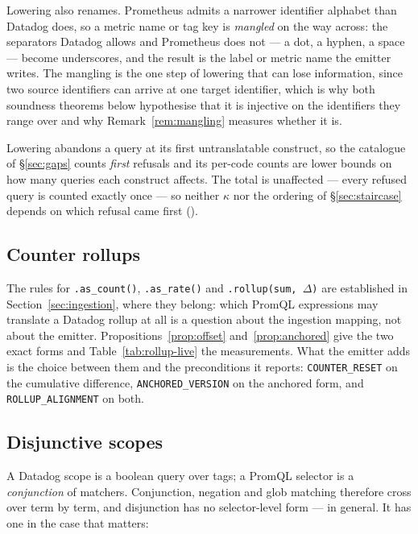 Lowering also renames. Prometheus admits a narrower identifier alphabet than Datadog
does, so a metric name or tag key is \emph{mangled} on the way across: the separators
Datadog allows and Prometheus does not --- a dot, a hyphen, a space --- become
underscores, and the result is the label or metric name the emitter writes. The mangling
is the one step of lowering that can lose information, since two source identifiers can
arrive at one target identifier, which is why both soundness theorems below hypothesise
that it is injective on the identifiers they range over and why
Remark~\ref{rem:mangling} measures whether it is.

Lowering abandons a query at its first untranslatable construct, so the catalogue of
\S\ref{sec:gaps} counts \emph{first} refusals and its per-code counts are lower bounds
on how many queries each construct affects. The total is unaffected --- every refused
query is counted exactly once --- so neither $\kappa$ nor the ordering of
\S\ref{sec:staircase} depends on which refusal came first ().

\iffull\fi

\subsection{Counter rollups}
The rules for \texttt{.as\_count()}, \texttt{.as\_rate()} and \texttt{.rollup(sum,
$\Delta$)} are established in Section~\ref{sec:ingestion}, where they belong: which
PromQL expressions may translate a Datadog rollup at all is a question about the
ingestion mapping, not about the emitter. Propositions~\ref{prop:offset}
and~\ref{prop:anchored} give the two exact forms and Table~\ref{tab:rollup-live} the
measurements. What the emitter adds is the choice between them and the preconditions it
reports: \texttt{COUNTER\_RESET} on the cumulative difference,
\texttt{ANCHORED\_VERSION} on the anchored form, and \texttt{ROLLUP\_ALIGNMENT} on
both.

\subsection{Disjunctive scopes}
\label{sec:disjunction}

A Datadog scope is a boolean query over tags; a PromQL selector is a \emph{conjunction}
of matchers. Conjunction, negation and glob matching therefore cross over term by term,
and disjunction has no selector-level form --- in general. It has one in the case that
matters:

